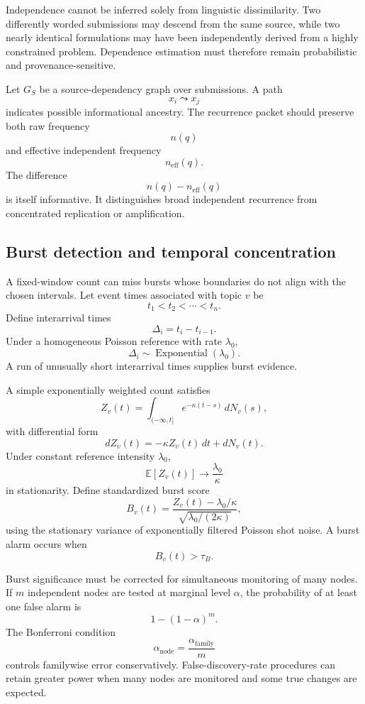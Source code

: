 \documentclass[11pt]{article}
\theoremstyle{definition}
\newcommand{\E}{\mathbb{E}}
\begin{document}
Independence cannot be inferred solely from linguistic dissimilarity. Two differently worded submissions may descend from the same source, while two nearly identical formulations may have been independently derived from a highly constrained problem. Dependence estimation must therefore remain probabilistic and provenance-sensitive.

Let \(G_S\) be a source-dependency graph over submissions. A path
\[
x_i\leadsto x_j
\]
indicates possible informational ancestry. The recurrence packet should preserve both raw frequency
\[
n(q)
\]
and effective independent frequency
\[
n_{\mathrm{eff}}(q).
\]
The difference
\[
n(q)-n_{\mathrm{eff}}(q)
\]
is itself informative. It distinguishes broad independent recurrence from concentrated replication or amplification.

\subsection{Burst detection and temporal concentration}

A fixed-window count can miss bursts whose boundaries do not align with the chosen intervals. Let event times associated with topic \(v\) be
\[
t_1<t_2<\cdots<t_n.
\]
Define interarrival times
\[
\Delta_i=t_i-t_{i-1}.
\]
Under a homogeneous Poisson reference with rate \(\lambda_0\),
\[
\Delta_i\sim\operatorname{Exponential}(\lambda_0).
\]
A run of unusually short interarrival times supplies burst evidence.

A simple exponentially weighted count satisfies
\[
Z_v(t)
=
\int_{(-\infty,t]}
e^{-\kappa(t-s)}\,dN_v(s),
\]
with differential form
\[
dZ_v(t)
=
-\kappa Z_v(t)\,dt+dN_v(t).
\]
Under constant reference intensity \(\lambda_0\),
\[
\E[Z_v(t)]
\to
\frac{\lambda_0}{\kappa}
\]
in stationarity. Define standardized burst score
\[
B_v(t)
=
\frac{
Z_v(t)-\lambda_0/\kappa
}{
\sqrt{\lambda_0/(2\kappa)}
},
\]
using the stationary variance of exponentially filtered Poisson shot noise. A burst alarm occurs when
\[
B_v(t)>\tau_B.
\]

Burst significance must be corrected for simultaneous monitoring of many nodes. If \(m\) independent nodes are tested at marginal level \(\alpha\), the probability of at least one false alarm is
\[
1-(1-\alpha)^m.
\]
The Bonferroni condition
\[
\alpha_{\mathrm{node}}
=
\frac{\alpha_{\mathrm{family}}}{m}
\]
controls familywise error conservatively. False-discovery-rate procedures can retain greater power when many nodes are monitored and some true changes are expected.
\end{document}
